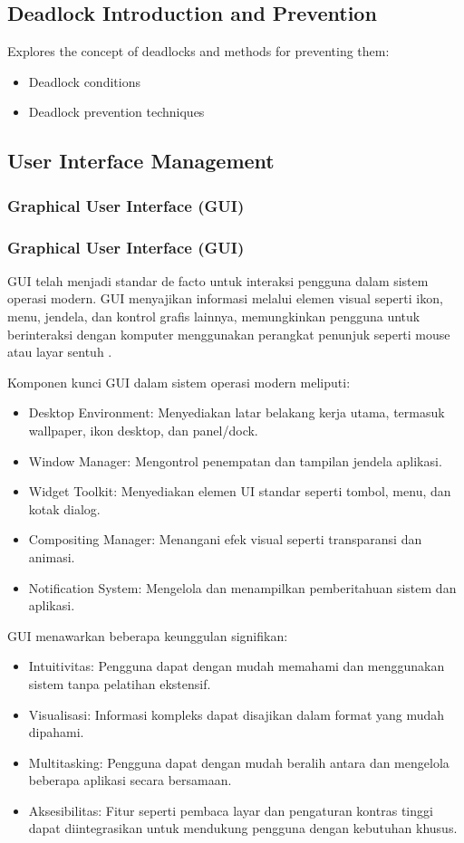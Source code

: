 \documentclass[12pt]{article}
\begin{document}
\subsection{Deadlock Introduction and Prevention}
Explores the concept of deadlocks and methods for preventing them:
\begin{itemize}
    \item Deadlock conditions
    \item Deadlock prevention techniques
\end{itemize}

\subsection{User Interface Management}
\subsubsection{Graphical User Interface (GUI)}
\subsubsection{Graphical User Interface (GUI)}
		
		GUI telah menjadi standar de facto untuk interaksi pengguna dalam sistem operasi modern. 
        GUI menyajikan informasi melalui elemen visual seperti ikon, menu, jendela, dan kontrol grafis lainnya, 
        memungkinkan pengguna untuk berinteraksi dengan komputer menggunakan perangkat penunjuk seperti mouse atau layar sentuh \cite{Shneiderman2016}.
		
		Komponen kunci GUI dalam sistem operasi modern meliputi:
		\begin{itemize}
			\item Desktop Environment: Menyediakan latar belakang kerja utama, termasuk wallpaper, ikon desktop, dan panel/dock.
			\item Window Manager: Mengontrol penempatan dan tampilan jendela aplikasi.
			\item Widget Toolkit: Menyediakan elemen UI standar seperti tombol, menu, dan kotak dialog.
			\item Compositing Manager: Menangani efek visual seperti transparansi dan animasi.
			\item Notification System: Mengelola dan menampilkan pemberitahuan sistem dan aplikasi.
		\end{itemize}
		
		GUI menawarkan beberapa keunggulan signifikan:
		\begin{itemize}
			\item Intuitivitas: Pengguna dapat dengan mudah memahami dan menggunakan sistem tanpa pelatihan ekstensif.
			\item Visualisasi: Informasi kompleks dapat disajikan dalam format yang mudah dipahami.
			\item Multitasking: Pengguna dapat dengan mudah beralih antara dan mengelola beberapa aplikasi secara bersamaan.
			\item Aksesibilitas: Fitur seperti pembaca layar dan pengaturan kontras tinggi dapat diintegrasikan untuk mendukung pengguna dengan kebutuhan khusus.
		\end{itemize}
\end{document}
